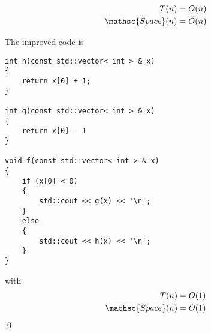 \begin{align*}
  T(n) &= O(n) \\
  \mathsc{Space}(n) &= O(n)
\end{align*}

The improved code is
\begin{Verbatim}[frame=single,fontsize=\small]
int h(const std::vector< int > & x)
{
    return x[0] + 1;
}

int g(const std::vector< int > & x)
{
    return x[0] - 1
}

void f(const std::vector< int > & x)
{
    if (x[0] < 0)
    {
        std::cout << g(x) << '\n';
    }
    else
    {
        std::cout << h(x) << '\n';
    }
}
\end{Verbatim}
with
\begin{align*}
  T(n) &= O(1) \\
  \mathsc{Space}(n) &= O(1)
\end{align*}
\qed
   
